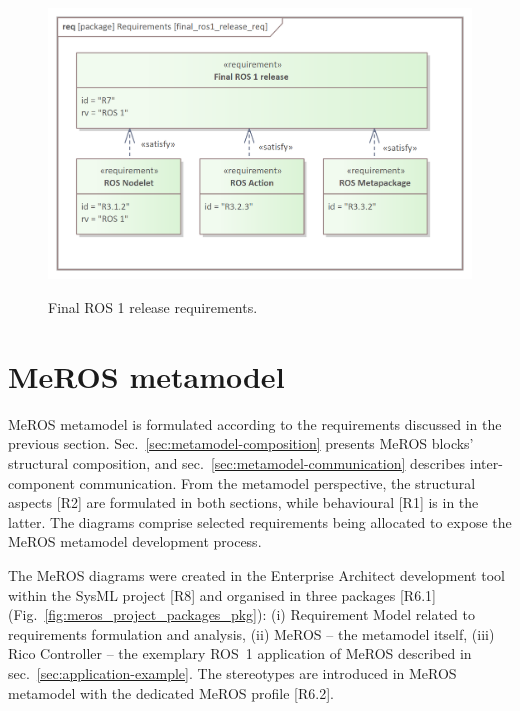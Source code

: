 \documentclass[11pt,oneside,a4paper]{article}
\begin{document}
	\begin{figure}[H]
		\centering
		\begin{center}
			{\includegraphics[scale=1.1]{img/requirement_pkg/final_ros1_release_req.png}}
		\end{center}
		\caption{Final ROS 1 release requirements.} 
		\label{fig:final_ros1_release_req}
	\end{figure}
	
	
	
\section{MeROS metamodel}
\label{sec:metamodel}
	
	MeROS metamodel is formulated according to the requirements discussed in the previous section. Sec.~\ref{sec:metamodel-composition} presents MeROS blocks' structural composition, and sec.~\ref{sec:metamodel-communication} describes inter-component communication. From the metamodel perspective, the structural aspects [R2] are formulated in both sections, while behavioural [R1] is in the latter. The diagrams comprise selected requirements being allocated to expose the MeROS metamodel development process. 
	
	The MeROS diagrams were created in the Enterprise Architect development tool within the SysML project [R8] and organised in three packages [R6.1] (Fig.~\ref{fig:meros_project_packages_pkg}): (i) Requirement Model related to requirements formulation and analysis, (ii) MeROS -- the metamodel itself, (iii) Rico Controller -- the exemplary ROS~1 application of MeROS described in sec.~\ref{sec:application-example}. The stereotypes are introduced in MeROS metamodel with the dedicated MeROS profile [R6.2].
	
\end{document}
